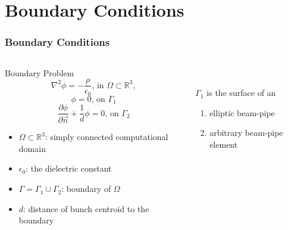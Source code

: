 \documentclass[xcolor=pdftex,table,10pt]{beamer}
\renewcommand {\Re}{{\mathbb{R}}}
\begin{document}
    \section{Boundary Conditions}
	
	\begin{frame}
		\frametitle{Boundary Conditions}

		\begin{columns}
		\begin{column}{5cm}

		\begin{block}{Boundary Problem}
            \[
	    		\nabla^2 \phi = -\frac{\rho}{\epsilon_0} \text{, in } \Omega \subset \Re^3 , \nonumber 
            \]
            \[
                \phi = 0 \text{, on }\Gamma_1  
            \]
            \[
                \frac{\partial \phi}{\partial \vec{n}} + \frac {1}{d} \phi = 0  \text{, on } \Gamma_2
            \]
		\end{block}
        \begin{itemize}
		\item $\Omega \subset \Re^3$: simply connected computational domain
		\item $\epsilon_0$: the dielectric constant
        \item $\Gamma= \Gamma_1 \cup \Gamma_2$: boundary of $\Omega$
        \item $d$: distance of bunch centroid to the boundary
        \end{itemize}
		
		\end{column}
		\begin{column}{5cm}
            \begin{center}
             \\
            \end{center}
            \vspace{0.2cm} 
			$\Gamma_1$ is the surface of an
    		\begin{enumerate}
	    		\item elliptic beam-pipe
		    	\item arbitrary beam-pipe element
    		\end{enumerate}
		\end{column}
		\end{columns}
		
	\end{frame}
\end{document}
